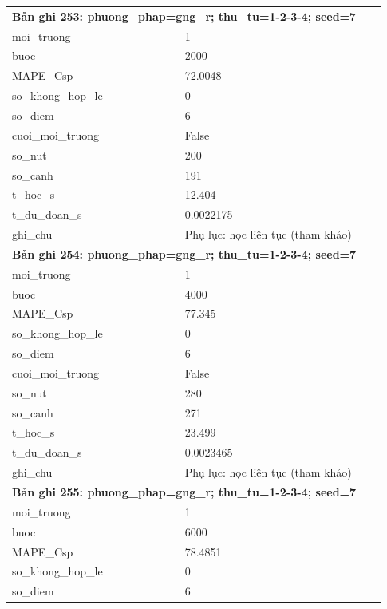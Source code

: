 \begin{longtable}{p{0.43\linewidth}p{0.50\linewidth}}
\midrule
\multicolumn{2}{p{0.95\linewidth}}{\textbf{Bản ghi 253: phuong\_phap=gng\_r; thu\_tu=1-2-3-4; seed=7}} \\
moi\_\allowbreak truong & 1 \\
buoc & 2000 \\
MAPE\_\allowbreak Csp & 72.0048 \\
so\_\allowbreak khong\_\allowbreak hop\_\allowbreak le & 0 \\
so\_\allowbreak diem & 6 \\
cuoi\_\allowbreak moi\_\allowbreak truong & False \\
so\_\allowbreak nut & 200 \\
so\_\allowbreak canh & 191 \\
t\_\allowbreak hoc\_\allowbreak s & 12.404 \\
t\_\allowbreak du\_\allowbreak doan\_\allowbreak s & 0.0022175 \\
ghi\_\allowbreak chu & Phụ lục: học liên tục (tham khảo) \\
\midrule
\multicolumn{2}{p{0.95\linewidth}}{\textbf{Bản ghi 254: phuong\_phap=gng\_r; thu\_tu=1-2-3-4; seed=7}} \\
moi\_\allowbreak truong & 1 \\
buoc & 4000 \\
MAPE\_\allowbreak Csp & 77.345 \\
so\_\allowbreak khong\_\allowbreak hop\_\allowbreak le & 0 \\
so\_\allowbreak diem & 6 \\
cuoi\_\allowbreak moi\_\allowbreak truong & False \\
so\_\allowbreak nut & 280 \\
so\_\allowbreak canh & 271 \\
t\_\allowbreak hoc\_\allowbreak s & 23.499 \\
t\_\allowbreak du\_\allowbreak doan\_\allowbreak s & 0.0023465 \\
ghi\_\allowbreak chu & Phụ lục: học liên tục (tham khảo) \\
\midrule
\multicolumn{2}{p{0.95\linewidth}}{\textbf{Bản ghi 255: phuong\_phap=gng\_r; thu\_tu=1-2-3-4; seed=7}} \\
moi\_\allowbreak truong & 1 \\
buoc & 6000 \\
MAPE\_\allowbreak Csp & 78.4851 \\
so\_\allowbreak khong\_\allowbreak hop\_\allowbreak le & 0 \\
so\_\allowbreak diem & 6 \\

\end{longtable}
